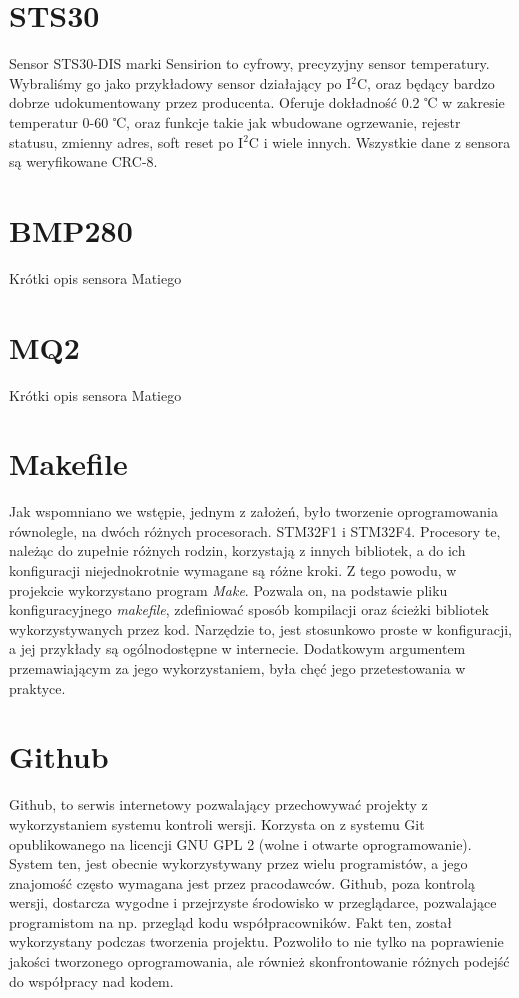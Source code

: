 \section{STS30}

Sensor STS30-DIS marki Sensirion to cyfrowy, precyzyjny sensor temperatury. Wybraliśmy go jako przykładowy sensor działający po I$^2$C, oraz będący bardzo dobrze udokumentowany przez producenta. Oferuje dokładność 0.2 ℃ w zakresie temperatur 0-60 ℃, oraz funkcje takie jak wbudowane ogrzewanie, rejestr statusu, zmienny adres, soft reset po I$^2$C i wiele innych\cite{sts_datasheet}. Wszystkie dane z sensora są weryfikowane CRC-8.

\section{BMP280}

Krótki opis sensora Matiego

\section{MQ2}

Krótki opis sensora Matiego

\section{Makefile}
Jak wspomniano we wstępie, jednym z założeń, było tworzenie oprogramowania równolegle, na dwóch różnych procesorach. STM32F1 i STM32F4. Procesory te, należąc do zupełnie różnych rodzin, korzystają z innych bibliotek, a do ich konfiguracji niejednokrotnie wymagane są różne kroki. Z tego powodu, w projekcie wykorzystano program \emph{Make}. Pozwala on, na podstawie pliku konfiguracyjnego \emph{makefile}, zdefiniować sposób kompilacji oraz ścieżki bibliotek wykorzystywanych przez kod. Narzędzie to, jest stosunkowo proste w konfiguracji, a jej przykłady są ogólnodostępne w internecie. Dodatkowym argumentem przemawiającym za jego wykorzystaniem, była chęć jego przetestowania w praktyce.

\section{Github}
Github, to serwis internetowy pozwalający przechowywać projekty z wykorzystaniem systemu kontroli wersji. Korzysta on z systemu Git opublikowanego na licencji GNU GPL 2 (wolne i otwarte oprogramowanie). System ten, jest obecnie wykorzystywany przez wielu programistów, a jego znajomość często wymagana jest przez pracodawców. Github, poza kontrolą wersji, dostarcza wygodne i przejrzyste środowisko w przeglądarce, pozwalające programistom na np. przegląd kodu współpracowników. Fakt ten, został wykorzystany podczas tworzenia projektu. Pozwoliło to nie tylko na poprawienie jakości tworzonego oprogramowania, ale również skonfrontowanie różnych podejść do współpracy nad kodem.
